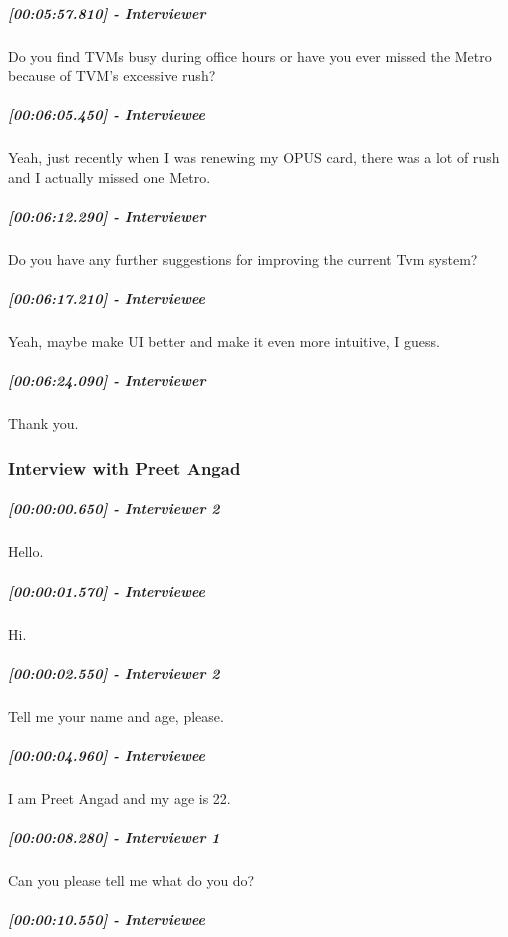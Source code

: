\documentclass[a4paper,12pt]{article}
\begin{document}
\hypertarget{interviewer-25}{%
\subparagraph{{[}00:05:57.810{]} - Interviewer}\label{interviewer-25}}

Do you find TVMs busy during office hours or have you ever missed the
Metro because of TVM's excessive rush?

\hypertarget{interviewee-25}{%
\subparagraph{{[}00:06:05.450{]} - Interviewee}\label{interviewee-25}}

Yeah, just recently when I was renewing my OPUS card, there was a lot of
rush and I actually missed one Metro.

\hypertarget{interviewer-26}{%
\subparagraph{{[}00:06:12.290{]} - Interviewer}\label{interviewer-26}}

Do you have any further suggestions for improving the current Tvm
system?

\hypertarget{interviewee-26}{%
\subparagraph{{[}00:06:17.210{]} - Interviewee}\label{interviewee-26}}

Yeah, maybe make UI better and make it even more intuitive, I guess.

\hypertarget{interviewer-27}{%
\subparagraph{{[}00:06:24.090{]} - Interviewer}\label{interviewer-27}}

Thank you.
\newpage
\subsubsection{Interview with Preet Angad}
\hypertarget{interviewer-2}{%
\subparagraph{{[}00:00:00.650{]} - Interviewer 2}\label{interviewer-2}}

Hello.

\hypertarget{interviewee}{%
\subparagraph{{[}00:00:01.570{]} - Interviewee}\label{interviewee}}

Hi.

\hypertarget{interviewer-2-1}{%
\subparagraph{{[}00:00:02.550{]} - Interviewer
2}\label{interviewer-2-1}}

Tell me your name and age, please.

\hypertarget{interviewee-1}{%
\subparagraph{{[}00:00:04.960{]} - Interviewee}\label{interviewee-1}}

I am Preet Angad and my age is 22.

\hypertarget{interviewer-1}{%
\subparagraph{{[}00:00:08.280{]} - Interviewer 1}\label{interviewer-1}}

Can you please tell me what do you do?

\hypertarget{interviewee-2}{%
\subparagraph{{[}00:00:10.550{]} - Interviewee}\label{interviewee-2}}
\end{document}
